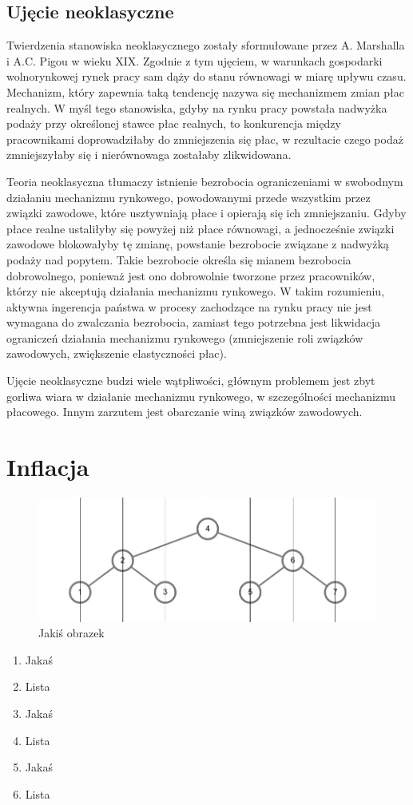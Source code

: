 \documentclass[12pt]{extarticle}
\begin{document}
\subsection{Ujęcie neoklasyczne}

Twierdzenia stanowiska neoklasycznego zostały sformułowane przez A. Marshalla i A.C. Pigou w wieku XIX. Zgodnie z tym ujęciem, w warunkach gospodarki wolnorynkowej rynek pracy sam dąży do stanu równowagi w miarę upływu czasu. Mechanizm, który zapewnia taką tendencję nazywa się mechanizmem zmian płac realnych. W myśl tego stanowiska, gdyby na rynku pracy powstała nadwyżka podaży przy określonej stawce płac realnych, to konkurencja między pracownikami doprowadziłaby do zmniejszenia się płac, w rezultacie czego podaż zmniejszyłaby się i nierównowaga zostałaby zlikwidowana.

Teoria neoklasyczna tłumaczy istnienie bezrobocia ograniczeniami w swobodnym działaniu mechanizmu rynkowego, powodowanymi przede wszystkim przez związki zawodowe, które usztywniają płace i opierają się ich zmniejszaniu. Gdyby płace realne ustaliłyby się powyżej niż płace równowagi, a jednocześnie związki zawodowe blokowałyby tę zmianę, powstanie bezrobocie związane z nadwyżką podaży nad popytem. Takie bezrobocie określa się mianem bezrobocia dobrowolnego, ponieważ jest ono dobrowolnie tworzone przez pracowników, którzy nie akceptują działania mechanizmu rynkowego. W takim rozumieniu, aktywna ingerencja państwa w procesy zachodzące na rynku pracy nie jest wymagana do zwalczania bezrobocia, zamiast tego potrzebna jest likwidacja ograniczeń działania mechanizmu rynkowego (zmniejszenie roli związków zawodowych, zwiększenie elastyczności płac).

Ujęcie neoklasyczne budzi wiele wątpliwości, głównym problemem jest zbyt gorliwa wiara w działanie mechanizmu rynkowego, w szczególności mechanizmu płacowego. Innym zarzutem jest obarczanie winą związków zawodowych.









\section{Inflacja}


\begin{figure}[H]
\centering
\includegraphics[width=15cm]{sample}
\caption{Jakiś obrazek}
\end{figure}


\begin{enumerate}
	\item Jakaś
	\item Lista
	\item Jakaś
	\item Lista
	\item Jakaś
	\item Lista
\end{enumerate}

\clearpage\mbox{}\clearpage
\end{document}
